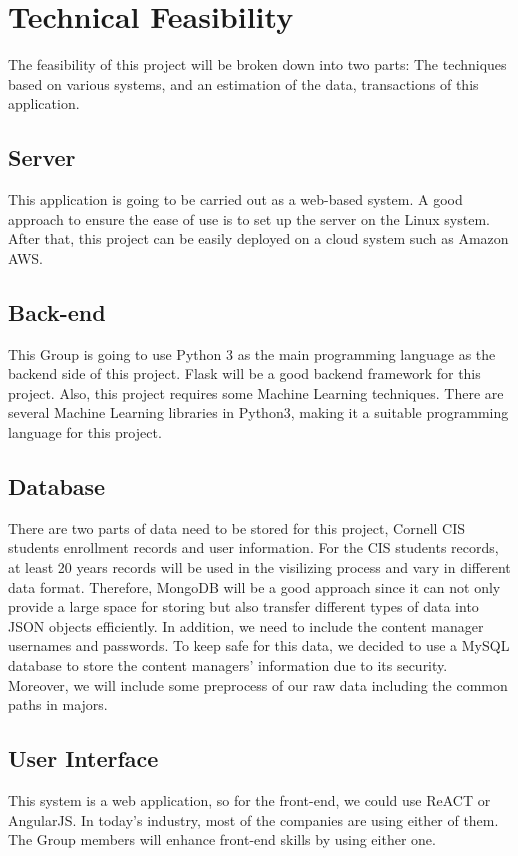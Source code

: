 \documentclass{article}
\begin{document}
\section{Technical Feasibility}
The feasibility of this project will be broken down into two parts: The techniques based on various systems, and an estimation of the data, transactions of this application.
\subsection{Server}
This application is going to be carried out as a web-based system. A good approach to ensure the ease of use is to set up the server on the Linux system. After that, this project can be easily deployed on a cloud system such as Amazon AWS.
\subsection{Back-end}
This Group is going to use Python 3 as the main programming language as the backend side of this project. Flask will be a good backend framework for this project. Also, this project requires some Machine Learning techniques.  There are several Machine Learning libraries in Python3, making it a suitable programming language for this project.
\subsection{Database}
There are two parts of data need to be stored for this project, Cornell CIS students enrollment records and user information.  For the CIS students records, at least 20 years records will be used in the visilizing process and vary in different data format. Therefore, MongoDB will be a good approach since it can not only provide a large space for storing but also transfer different types of data into JSON objects efficiently. In addition, we need to include the content manager usernames and passwords. To keep safe for this data, we decided to use a MySQL database to store the content managers’ information due to its security. Moreover, we will include some preprocess of our raw data including the common paths in majors.
\subsection{User Interface}
This system is a web application, so for the front-end, we could use ReACT or AngularJS. In today’s industry, most of the companies are using either of them. The Group members will enhance front-end skills by using either one.
\end{document}
